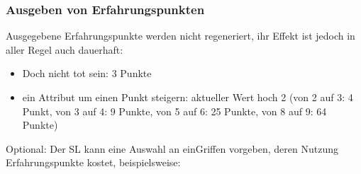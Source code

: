  

\subsubsection{Ausgeben von Erfahrungspunkten}

Ausgegebene Erfahrungspunkte werden nicht regeneriert, ihr Effekt ist jedoch in aller Regel auch dauerhaft:
\begin{itemize}
\item Doch nicht tot sein: 3 Punkte
\item ein Attribut um einen Punkt steigern: aktueller Wert hoch 2 (von 2 auf 3: 4 Punkt, von 3 auf 4: 9 Punkte, von 5 auf 6: 25 Punkte, von 8 auf 9: 64 Punkte)
\end{itemize}
 

Optional: Der SL kann eine Auswahl an einGriffen vorgeben, deren Nutzung Erfahrungspunkte kostet, beispielsweise:

 
